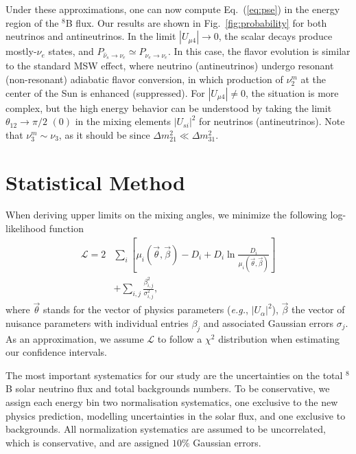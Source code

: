 \documentclass[
reprint,
superscriptaddress,
showpacs,
preprintnumbers,
nofootinbib,
nobibnotes,
amsmath,
amssymb, 
aps,
prd,
floatfix
]{revtex4-1}
\newcommand{\refeq}[1]{Eq.~(\ref{#1})}
\def\eg{\emph{e.g.}}
\begin{document}
Under these approximations, one can now compute \refeq{eq:pse} in the energy region of the $^8$B flux. Our results are shown in Fig.~\ref{fig:probability} for both neutrinos and antineutrinos. In the limit $|U_{\mu4}|\to0$, the scalar decays produce mostly-$\nu_e$ states, and $P_{\hat{\nu}_s\to\nu_e}\simeq P_{\nu_e\to \nu_e}$. In this case, the flavor evolution is similar to the standard MSW effect, where neutrino (antineutrinos) undergo resonant (non-resonant) adiabatic flavor conversion, in which production of $\nu_2^m$ at the center of the Sun is enhanced (suppressed). For $|U_{\mu4}|\neq0$, the situation is more complex, but the high energy behavior can be understood by taking the limit $\theta_{12}\to \pi/2$ $(0)$ in the mixing elements $|U_{si}|^2$ for neutrinos (antineutrinos). Note that $\nu_3^m \sim \nu_3$, as it should be since $\Delta m^2_{21} \ll \Delta m^2_{31}$.



\section{Statistical Method}\label{app:statistics}

When deriving upper limits on the mixing angles, we minimize the following log-likelihood function  
%
\begin{align}
\mathcal{L} = 2 &\sum_{i} \left[ \mu_i (\vec{\theta},\vec{\beta}) - D_i + D_i \ln{\frac{D_i}{\mu_i(\vec{\theta},\vec{\beta})}} \right]
\\\nonumber
&+ \sum_{i,j} \frac{\beta_{i,j}^2}{\sigma_{i,j}^2},
\end{align}
%
where $\vec{\theta}$ stands for the vector of physics parameters (\eg, $|U_{\alpha}|^2$), $\vec{\beta}$ the vector of nuisance parameters with individual entries $\beta_j$ and associated Gaussian errors $\sigma_j$. As an approximation, we assume $\mathcal{L}$ to follow a $\chi^2$ distribution when estimating our confidence intervals. 

The most important systematics for our study are the uncertainties on the total $^8$B solar neutrino flux and total backgrounds numbers. To be conservative, we assign each energy bin two normalisation systematics, one exclusive to the new physics prediction, modelling uncertainties in the solar flux, and one exclusive to backgrounds. All normalization systematics are assumed to be uncorrelated, which is conservative, and are assigned $10\%$ Gaussian errors.

\end{document}
